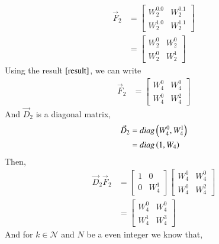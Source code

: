 \documentclass[journal,12pt,twocolumn]{IEEEtran}
\renewcommand\thesection{\arabic{section}}
\begin{document}
\begin{enumerate}[label=\arabic*.,ref=\thesection.\theenumi]
      \begin{align}
        \vec{F}_{2} &= 
        \begin{bmatrix}
          W_2^{0.0} & W_2^{0.1} \\
          W_2^{1.0} & W_2^{1.1}
        \end{bmatrix} \\
        &= \begin{bmatrix}
                      W_2^{0} & W_2^{0} \\
                      W_2^{0} & W_2^{1}
              \end{bmatrix}
      \end{align}
     Using the result $\eqref{result}$, we can write
       \begin{align}
       \vec{F}_{2} &= 
       \begin{bmatrix}
         W_4^{0} & W_4^{0} \\
         W_4^{0} & W_4^{2}
       \end{bmatrix} 
    \end{align}
     And $\vec{D}_{2}$ is a diagonal matrix,
      \begin{align}
        \vec{D}_{2} &= diag\left(W_4^0,W_4^1\right) \\
                    &= diag\left(1,W_4\right)
      \end{align}
      Then,
       \begin{align}
          \vec{D}_2\vec{F}_2 &=\begin{bmatrix}
                              1 & 0 \\
                              0 & W_4^{1}
                              \end{bmatrix}  
                             \begin{bmatrix}
                              W_4^{0} & W_4^{0} \\
                              W_4^{0} & W_4^{2}
                               \end{bmatrix} \\
                            &= \begin{bmatrix}
                              W_4^{0} & W_4^{0} \\
                              W_4^{1} & W_4^{3}
                              \end{bmatrix}
       \end{align}
    And for $k \in \mathcal{N}$ and $N$ be a even integer we know that,
     \begin{align}

\end{align}
\end{enumerate}
\end{document}

